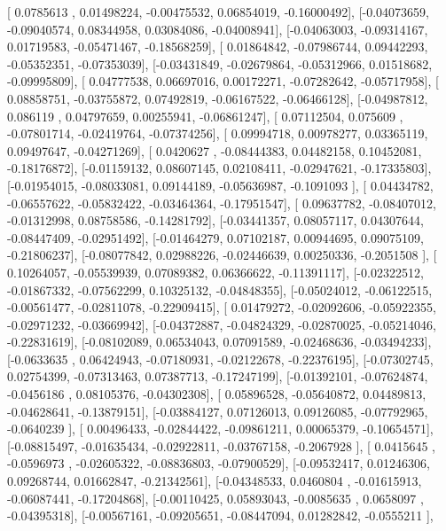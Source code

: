 \documentclass{article}
\begin{document}
       [ 0.0785613 ,  0.01498224, -0.00475532,  0.06854019, -0.16000492],
       [-0.04073659, -0.09040574,  0.08344958,  0.03084086, -0.04008941],
       [-0.04063003, -0.09314167,  0.01719583, -0.05471467, -0.18568259],
       [ 0.01864842, -0.07986744,  0.09442293, -0.05352351, -0.07353039],
       [-0.03431849, -0.02679864, -0.05312966,  0.01518682, -0.09995809],
       [ 0.04777538,  0.06697016,  0.00172271, -0.07282642, -0.05717958],
       [ 0.08858751, -0.03755872,  0.07492819, -0.06167522, -0.06466128],
       [-0.04987812,  0.086119  ,  0.04797659,  0.00255941, -0.06861247],
       [ 0.07112504,  0.075609  , -0.07801714, -0.02419764, -0.07374256],
       [ 0.09994718,  0.00978277,  0.03365119,  0.09497647, -0.04271269],
       [ 0.0420627 , -0.08444383,  0.04482158,  0.10452081, -0.18176872],
       [-0.01159132,  0.08607145,  0.02108411, -0.02947621, -0.17335803],
       [-0.01954015, -0.08033081,  0.09144189, -0.05636987, -0.1091093 ],
       [ 0.04434782, -0.06557622, -0.05832422, -0.03464364, -0.17951547],
       [ 0.09637782, -0.08407012, -0.01312998,  0.08758586, -0.14281792],
       [-0.03441357,  0.08057117,  0.04307644, -0.08447409, -0.02951492],
       [-0.01464279,  0.07102187,  0.00944695,  0.09075109, -0.21806237],
       [-0.08077842,  0.02988226, -0.02446639,  0.00250336, -0.2051508 ],
       [ 0.10264057, -0.05539939,  0.07089382,  0.06366622, -0.11391117],
       [-0.02322512, -0.01867332, -0.07562299,  0.10325132, -0.04848355],
       [-0.05024012, -0.06122515, -0.00561477, -0.02811078, -0.22909415],
       [ 0.01479272, -0.02092606, -0.05922355, -0.02971232, -0.03669942],
       [-0.04372887, -0.04824329, -0.02870025, -0.05214046, -0.22831619],
       [-0.08102089,  0.06534043,  0.07091589, -0.02468636, -0.03494233],
       [-0.0633635 ,  0.06424943, -0.07180931, -0.02122678, -0.22376195],
       [-0.07302745,  0.02754399, -0.07313463,  0.07387713, -0.17247199],
       [-0.01392101, -0.07624874, -0.0456186 ,  0.08105376, -0.04302308],
       [ 0.05896528, -0.05640872,  0.04489813, -0.04628641, -0.13879151],
       [-0.03884127,  0.07126013,  0.09126085, -0.07792965, -0.0640239 ],
       [ 0.00496433, -0.02844422, -0.09861211,  0.00065379, -0.10654571],
       [-0.08815497, -0.01635434, -0.02922811, -0.03767158, -0.2067928 ],
       [ 0.0415645 , -0.0596973 , -0.02605322, -0.08836803, -0.07900529],
       [-0.09532417,  0.01246306,  0.09268744,  0.01662847, -0.21342561],
       [-0.04348533,  0.0460804 , -0.01615913, -0.06087441, -0.17204868],
       [-0.00110425,  0.05893043, -0.0085635 ,  0.0658097 , -0.04395318],
       [-0.00567161, -0.09205651, -0.08447094,  0.01282842, -0.0555211 ],
\end{document}
